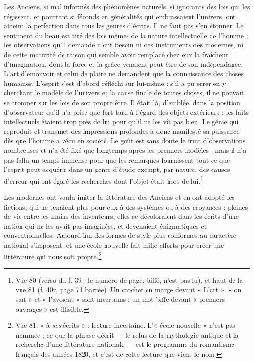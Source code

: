 \documentclass[11pt,a4paper]{article}
\begin{document}
Les Anciens, si mal informés des phénomènes naturels, si ignorants des lois qui
les régissent, et pourtant si féconds en généralités qui embrassaient l'univers,
ont atteint la perfection dans tous les genres d'écrire. Il ne faut pas s'en
étonner. Le sentiment du beau est tiré des lois mêmes de la nature intellectuelle
de l'homme ; les observations qu'il demande n'ont besoin ni des instruments des
modernes, ni de cette maturité de raison qui semble avoir remplacé chez eux la
fraîcheur d'imagination, dont la force et la grâce venaient peut-être de son
indépendance. L'art d'émouvoir et celui de plaire ne demandent que la
connaissance des choses humaines. L'esprit s'est d'abord réfléchi sur lui-même :
s'il a pu errer en y cherchant le modèle de l'univers et la cause finale de
toutes choses, il ne pouvait se tromper sur les lois de son propre être. Il était
là, d'emblée, dans la position d'observateur qu'il n'a prise que fort tard à
l'égard des objets extérieurs : les faits intellectuels étaient trop près de lui
pour qu'il ne les vît pas bien. Le génie qui reproduit et transmet des
impressions profondes a donc manifesté sa puissance dès que l'homme a vécu en
société. Le goût est sans doute le fruit d'observations nombreuses et n'a été
fixé que longtemps après les premiers modèles ; mais il n'a pas fallu un temps
immense pour que les remarques fournissent tout ce que l'esprit peut acquérir
dans un genre d'étude exempt, par nature, des causes d'erreur qui ont égaré les
recherches dont l'objet était hors de lui.\footnote{Vue 80 (verso du f. 39 ; le
numéro de page, biffé, n'est pas lu), et haut de la vue 81 (f. 40r, page 71
barrée). Un crochet en marge devant « L'art ». « on sait » et « l'avoient » sont
incertains ; un mot biffé devant « premiers ouvrages » est illisible.}

Les modernes ont voulu imiter la littérature des Anciens et en ont adopté les
fictions, qui ne tenaient plus pour eux à des systèmes ou à des croyances : pleines
de vie entre les mains des inventeurs, elles se décoloraient dans les écrits
d'une nation qui ne les avait pas imaginées, et devenaient énigmatiques et
conventionnelles. Aujourd'hui des formes de style plus conformes au caractère
national s'imposent, et une école nouvelle fait mille efforts pour créer une
littérature qui nous soit propre.\footnote{Vue 81. « à \emph{ses} écrits » :
lecture incertaine. L'« école nouvelle » n'est pas nommée ; ce que la phrase
décrit — le refus de la mythologie antique et la recherche d'une littérature
nationale — est le programme du romantisme français des années 1820, et c'est
de cette lecture que vient le nom.}
\end{document}

